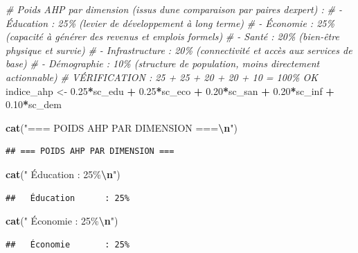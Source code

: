 \documentclass[
]{article}
\newenvironment{Shaded}{\begin{snugshade}}{\end{snugshade}}
\newcommand{\CommentTok}[1]{\textcolor[rgb]{0.56,0.35,0.01}{\textit{#1}}}
\newcommand{\FloatTok}[1]{\textcolor[rgb]{0.00,0.00,0.81}{#1}}
\newcommand{\FunctionTok}[1]{\textcolor[rgb]{0.13,0.29,0.53}{\textbf{#1}}}
\newcommand{\NormalTok}[1]{#1}
\newcommand{\OtherTok}[1]{\textcolor[rgb]{0.56,0.35,0.01}{#1}}
\newcommand{\SpecialCharTok}[1]{\textcolor[rgb]{0.81,0.36,0.00}{\textbf{#1}}}
\newcommand{\StringTok}[1]{\textcolor[rgb]{0.31,0.60,0.02}{#1}}
\begin{document}
\begin{Shaded}
\begin{Highlighting}[]
\CommentTok{\# Poids AHP par dimension (issus d\textquotesingle{}une comparaison par paires d\textquotesingle{}expert) :}
\CommentTok{\# {-} Éducation   : 25\% (levier de développement à long terme)}
\CommentTok{\# {-} Économie    : 25\% (capacité à générer des revenus et emplois formels)}
\CommentTok{\# {-} Santé       : 20\% (bien{-}être physique et survie)}
\CommentTok{\# {-} Infrastructure : 20\% (connectivité et accès aux services de base)}
\CommentTok{\# {-} Démographie : 10\% (structure de population, moins directement actionnable)}
\CommentTok{\# VÉRIFICATION : 25 + 25 + 20 + 20 + 10 = 100\% OK}
\NormalTok{indice\_ahp }\OtherTok{\textless{}{-}} \FloatTok{0.25}\SpecialCharTok{*}\NormalTok{sc\_edu }\SpecialCharTok{+} \FloatTok{0.25}\SpecialCharTok{*}\NormalTok{sc\_eco }\SpecialCharTok{+} \FloatTok{0.20}\SpecialCharTok{*}\NormalTok{sc\_san }\SpecialCharTok{+} \FloatTok{0.20}\SpecialCharTok{*}\NormalTok{sc\_inf }\SpecialCharTok{+} \FloatTok{0.10}\SpecialCharTok{*}\NormalTok{sc\_dem}

\FunctionTok{cat}\NormalTok{(}\StringTok{"=== POIDS AHP PAR DIMENSION ===}\SpecialCharTok{\textbackslash{}n}\StringTok{"}\NormalTok{)}
\end{Highlighting}
\end{Shaded}

\begin{verbatim}
## === POIDS AHP PAR DIMENSION ===
\end{verbatim}

\begin{Shaded}
\begin{Highlighting}[]
\FunctionTok{cat}\NormalTok{(}\StringTok{"  Éducation      : 25\%}\SpecialCharTok{\textbackslash{}n}\StringTok{"}\NormalTok{)}
\end{Highlighting}
\end{Shaded}

\begin{verbatim}
##   Éducation      : 25%
\end{verbatim}

\begin{Shaded}
\begin{Highlighting}[]
\FunctionTok{cat}\NormalTok{(}\StringTok{"  Économie       : 25\%}\SpecialCharTok{\textbackslash{}n}\StringTok{"}\NormalTok{)}
\end{Highlighting}
\end{Shaded}

\begin{verbatim}
##   Économie       : 25%
\end{verbatim}
\end{document}
